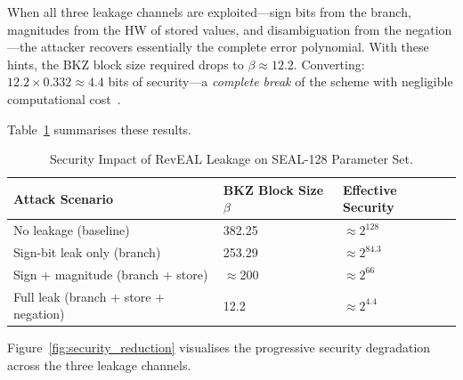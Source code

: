 \documentclass[sigconf,nonacm]{acmart}
\begin{document}
When all three leakage channels are exploited---sign bits from the branch, magnitudes
from the HW of stored values, and disambiguation from the negation---the attacker
recovers essentially the complete error polynomial. With these hints, the BKZ block
size required drops to $\beta \approx 12.2$. Converting: $12.2 \times 0.332
\approx 4.4$ bits of security---a \emph{complete break} of the scheme with
negligible computational cost~\cite{aydin2022reveal}.

Table~\ref{tab:security_impact} summarises these results.

\begin{table}[h]
\caption{Security Impact of RevEAL Leakage on SEAL-128 Parameter Set.}
\label{tab:security_impact}
\small
\begin{tabularx}{\columnwidth}{@{}X p{1.5cm} p{1.7cm}@{}}
\toprule
\textbf{Attack Scenario} & \textbf{BKZ Block Size $\beta$} & \textbf{Effective Security} \\
\midrule
No leakage (baseline) & 382.25 & $\approx 2^{128}$ \\
Sign-bit leak only (branch) & 253.29 & $\approx 2^{84.3}$ \\
Sign + magnitude (branch + store) & $\approx$200 & $\approx 2^{66}$ \\
Full leak (branch + store + negation) & 12.2 & $\approx 2^{4.4}$ \\
\bottomrule
\end{tabularx}
\end{table}

Figure~\ref{fig:security_reduction} visualises the progressive security degradation
across the three leakage channels.
\end{document}
